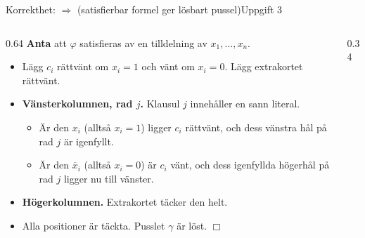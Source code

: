 \documentclass[aspectratio=169,10pt]{beamer}
\newcommand{\hkort}[7][]{%
  \begin{scope}[shift={(#2,#3)},#1]
    \foreach \b [count=\j] in {#4} {\xdef\kortm{\j}}%
    \pgfmathsetmacro{\kH}{0.62+\kortm*0.36+0.34}%
    \path[#7] (0,0) -- (0.52,0) -- (0.52,0.13) -- (0.78,0.13) -- (0.78,0) -- (1.3,0)
      -- (1.3,\kH-0.50) -- (1.17,\kH-0.50) -- (1.17,\kH-0.32) -- (1.3,\kH-0.32) -- (1.3,\kH)
      -- (0,\kH) -- (0,\kH-0.32) -- (0.13,\kH-0.32) -- (0.13,\kH-0.50) -- (0,\kH-0.50) -- cycle;
    \node[font=\scriptsize,inner sep=0pt] at (0.65,\kH-0.25) {#6};
    \foreach \b [count=\j] in {#4} {
      \ifnum\b=1 \path[fill=#7m] (0.38,\kH-0.44-\j*0.36) circle (0.105);
      \else \path[korthal] (0.38,\kH-0.44-\j*0.36) circle (0.105); \fi}
    \foreach \b [count=\j] in {#5} {
      \ifnum\b=1 \path[fill=#7m] (0.92,\kH-0.44-\j*0.36) circle (0.105);
      \else \path[korthal] (0.92,\kH-0.44-\j*0.36) circle (0.105); \fi}
  \end{scope}}
\newcommand{\spegel}[1]{\scalebox{-1}[1]{#1}}
\newcommand{\xbar}[1]{\overline{x}_{#1}}
\begin{document}
\begin{frame}{Korrekthet: $\Rightarrow$ (satisfierbar formel ger lösbart pussel)}{Uppgift 3}
  \begin{columns}[T]
    \begin{column}{0.64\textwidth}
      \textbf{Anta} att $\varphi$ satisfieras av en tilldelning av $x_1,\dots,x_n$.
      \begin{itemize}
        \item<2-> Lägg $c_i$ rättvänt om $x_i=1$ och vänt om $x_i=0$. Lägg extrakortet rättvänt.
        \item<3-> \textbf{Vänsterkolumnen, rad $j$.} Klausul $j$ innehåller en sann literal.
          \begin{itemize}
            \item Är den $x_i$ (alltså $x_i=1$) ligger $c_i$ rättvänt, och dess vänstra hål på rad $j$ är igenfyllt.
            \item Är den $\xbar{i}$ (alltså $x_i=0$) är $c_i$ vänt, och dess igenfyllda högerhål på rad $j$ ligger nu till vänster.
          \end{itemize}
        \item<4-> \textbf{Högerkolumnen.} Extrakortet täcker den helt.
        \item<5-> Alla positioner är täckta. Pusslet $\gamma$ är löst. \hfill$\Box$
      \end{itemize}
    \end{column}
    \begin{column}{0.34\textwidth}
      \centering
    \end{column}
  \end{columns}
\end{frame}
\end{document}
